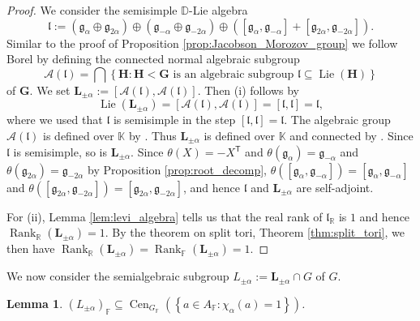 \documentclass[12pt]{amsart}
\newcommand{\F}{\mathbb{F} }
\newcommand{\R}{\mathbb{R} }
\newcommand{\D}{\mathbb{D} }
\newcommand{\K}{\mathbb{K}}
\newcommand{\frakg}{\mathfrak{g}}
\newcommand{\frakl}{\mathfrak{l}}
\newcommand{\bG}{\mathbf{G}}
\newcommand{\bH}{\mathbf{H}}
\newcommand{\bL}{\mathbf{L}}
\newcommand{\tran}{{^{\mathsf{T}}\!}}
\numberwithin{equation}{section}
\newtheorem{lemma}[theorem]{Lemma}
\theoremstyle{remark} %
\begin{document}
\begin{proof}
    We consider the semisimple $\D$-Lie algebra 
    $$
    \frakl :=  ( \frakg_\alpha \oplus \frakg_{2\alpha} ) \oplus (\frakg_{-\alpha} \oplus \frakg_{-2\alpha} ) \oplus ( [\frakg_\alpha , \frakg_{-\alpha}] + [\frakg_{2\alpha}, \frakg_{-2\alpha}] ).
    $$
    Similar to the proof of Proposition \ref{prop:Jacobson_Morozov_group} we follow Borel \cite[7.1]{Bor} by defining the connected normal algebraic subgroup
    $$
    \mathcal{A}(\frakl) = \bigcap \left\{ \bH \colon \bH<\bG \text{ is an algebraic subgroup } \frakl \subseteq \operatorname{Lie}(\bH) \right\}
    $$
    of $\bG$. We set $\bL_{\pm \alpha} := [\mathcal{A}(\frakl), \mathcal{A}(\frakl)]$. Then (i) follows by
    $$
    \operatorname{Lie}(\bL_{\pm \alpha}) = [\mathcal{A}(\frakl) , \mathcal{A}(\frakl)] = [\frakl , \frakl] = \frakl ,
    $$
    where we used that $\frakl$ is semisimple in the step $[\frakl, \frakl] = \frakl$. The algebraic group $\mathcal{A}(\frakl)$ is defined over $\K$ by \cite[2.1(b)]{Bor}. Thus $\bL_{\pm \alpha}$ is defined over $\K$ and connected by \cite[2.3]{Bor}. Since $\frakl$ is semisimple, so is $\bL_{\pm \alpha}$. Since $\theta(X) = -X\tran$ and $\theta(\frakg_\alpha) = \frakg_{-\alpha}$ and $\theta(\frakg_{2\alpha}) = \frakg_{-2\alpha}$ by Proposition \ref{prop:root_decomp}, $\theta([\frakg_\alpha, \frakg_{-\alpha}]) = [\frakg_\alpha, \frakg_{-\alpha}]$ and $\theta([\frakg_{2\alpha}, \frakg_{-2\alpha}]) = [\frakg_{2\alpha}, \frakg_{-2\alpha}]$, and hence $\frakl$ and $\bL_{\pm \alpha}$ are self-adjoint. 
    
    For (ii), Lemma \ref{lem:levi_algebra} tells us that the real rank of $\frakl_\R$ is $1$ and hence $\operatorname{Rank}_\R(\bL_{\pm \alpha}) = 1$. By the theorem on split tori, Theorem \ref{thm:split_tori}, we then have $\operatorname{Rank}_\R(\bL_{\pm\alpha}) = \operatorname{Rank}_\F(\bL_{\pm \alpha}) = 1$. 
\end{proof}
We now consider the semialgebraic subgroup $L_{\pm \alpha} := \bL_{\pm \alpha} \cap G$ of $G$.
\begin{lemma}\label{lem:levi_fixes_A}
  $(L_{\pm \alpha})_\F \subseteq \operatorname{Cen}_{G_\F}(\left\{ a \in A_\F \colon \chi_\alpha (a) = 1 \right\})$.
\end{lemma}
\end{document}
